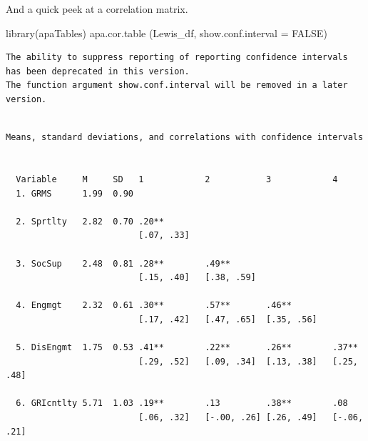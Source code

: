 \documentclass[
  11pt,
]{book}
\newenvironment{Shaded}{\begin{snugshade}}{\end{snugshade}}
\newcommand{\AttributeTok}[1]{\textcolor[rgb]{0.77,0.63,0.00}{#1}}
\newcommand{\ConstantTok}[1]{\textcolor[rgb]{0.00,0.00,0.00}{#1}}
\newcommand{\FunctionTok}[1]{\textcolor[rgb]{0.00,0.00,0.00}{#1}}
\newcommand{\NormalTok}[1]{#1}
\begin{document}
And a quick peek at a correlation matrix.

\begin{Shaded}
\begin{Highlighting}[]
\FunctionTok{library}\NormalTok{(apaTables)}
\FunctionTok{apa.cor.table}\NormalTok{ (Lewis\_df, }\AttributeTok{show.conf.interval =} \ConstantTok{FALSE}\NormalTok{)}
\end{Highlighting}
\end{Shaded}

\begin{verbatim}
The ability to suppress reporting of reporting confidence intervals has been deprecated in this version.
The function argument show.conf.interval will be removed in a later version.
\end{verbatim}

\begin{verbatim}

Means, standard deviations, and correlations with confidence intervals
 

  Variable     M     SD   1            2           3            4           
  1. GRMS      1.99  0.90                                                   
                                                                            
  2. Sprtlty   2.82  0.70 .20**                                             
                          [.07, .33]                                        
                                                                            
  3. SocSup    2.48  0.81 .28**        .49**                                
                          [.15, .40]   [.38, .59]                           
                                                                            
  4. Engmgt    2.32  0.61 .30**        .57**       .46**                    
                          [.17, .42]   [.47, .65]  [.35, .56]               
                                                                            
  5. DisEngmt  1.75  0.53 .41**        .22**       .26**        .37**       
                          [.29, .52]   [.09, .34]  [.13, .38]   [.25, .48]  
                                                                            
  6. GRIcntlty 5.71  1.03 .19**        .13         .38**        .08         
                          [.06, .32]   [-.00, .26] [.26, .49]   [-.06, .21] 
                                                                            

\end{verbatim}
\end{document}

